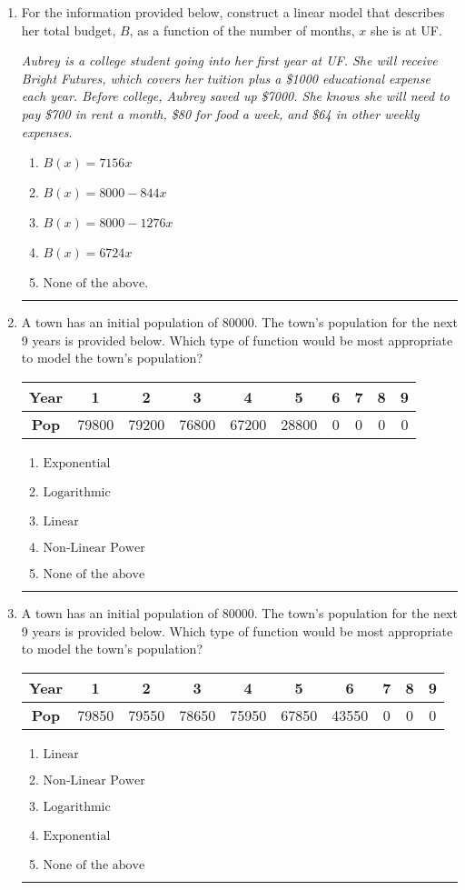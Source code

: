 \documentclass[14pt]{extbook}
\newcommand{\litem}[1]{\item#1\hspace*{-1cm}\rule{\textwidth}{0.4pt}}
\begin{document}
\begin{enumerate}
\litem{
For the information provided below, construct a linear model that describes her total budget, $B$, as a function of the number of months, $x$ she is at UF.
\begin{center}
    \textit{ Aubrey is a college student going into her first year at UF. She will receive Bright Futures, which covers her tuition plus a \$1000 educational expense each year. Before college, Aubrey saved up \$7000. She knows she will need to pay \$700 in rent a month, \$80 for food a week, and \$64 in other weekly expenses. }
\end{center}
\begin{enumerate}[label=\Alph*.]
\item \( B(x) = 7156 x \)
\item \( B(x) = 8000 - 844 x \)
\item \( B(x) = 8000 - 1276 x \)
\item \( B(x) = 6724 x \)
\item \( \text{None of the above.} \)

\end{enumerate} }
\litem{
A town has an initial population of 80000. The town's population for the next 9 years is provided below. Which type of function would be most appropriate to model the town's population?

\begin{tabular}{c|c|c|c|c|c|c|c|c|c}
\textbf{Year} &1 &2 &3 &4 &5 &6 &7 &8 &9\tabularnewline \hline
\textbf{Pop} &79800 &79200 &76800 &67200 &28800 &0 &0 &0 &0\end{tabular}\begin{enumerate}[label=\Alph*.]
\item \( \text{Exponential} \)
\item \( \text{Logarithmic} \)
\item \( \text{Linear} \)
\item \( \text{Non-Linear Power} \)
\item \( \text{None of the above} \)

\end{enumerate} }
\litem{
A town has an initial population of 80000. The town's population for the next 9 years is provided below. Which type of function would be most appropriate to model the town's population?

\begin{tabular}{c|c|c|c|c|c|c|c|c|c}
\textbf{Year} &1 &2 &3 &4 &5 &6 &7 &8 &9\tabularnewline \hline
\textbf{Pop} &79850 &79550 &78650 &75950 &67850 &43550 &0 &0 &0\end{tabular}\begin{enumerate}[label=\Alph*.]
\item \( \text{Linear} \)
\item \( \text{Non-Linear Power} \)
\item \( \text{Logarithmic} \)
\item \( \text{Exponential} \)
\item \( \text{None of the above} \)


\end{enumerate}}
\end{enumerate}
\end{document}
